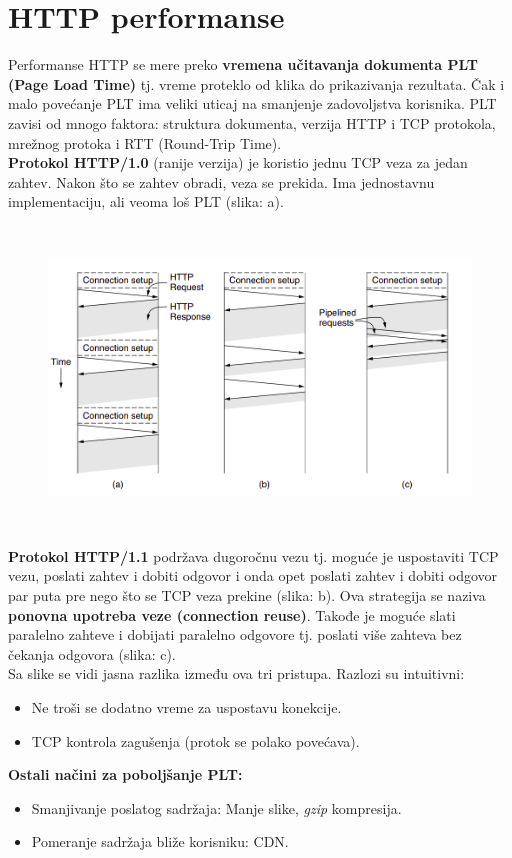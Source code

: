 \documentclass[a4paper]{article}
\begin{document}
\section{HTTP performanse}
    Performanse HTTP se mere preko \textbf{vremena učitavanja dokumenta PLT (Page Load Time)} tj.
    vreme proteklo od klika do prikazivanja rezultata. Čak i malo povećanje PLT ima veliki uticaj
    na smanjenje zadovoljstva korisnika. PLT zavisi od mnogo faktora: struktura dokumenta,
    verzija HTTP i TCP protokola, mrežnog protoka i RTT (Round-Trip Time).\\
    \indent \textbf{Protokol HTTP/1.0} (ranije verzija) je koristio jednu TCP veza za jedan zahtev. 
    Nakon što se zahtev obradi, veza se prekida. Ima jednostavnu implementaciju, 
    ali veoma loš PLT (slika: a). 
    \begin{figure}[H]
        \begin{center}
            \includegraphics[width=120mm,height=80mm]{Slike/http7.png}
        \end{center}
    \end{figure}

    \textbf{Protokol HTTP/1.1} podržava dugoročnu vezu tj. moguće je uspostaviti TCP vezu, poslati
    zahtev i dobiti odgovor i onda opet poslati zahtev i dobiti odgovor par puta pre nego što se
    TCP veza prekine (slika: b). Ova strategija se naziva 
    \textbf{ponovna upotreba veze (connection reuse)}. Takođe je moguće slati paralelno zahteve
    i dobijati paralelno odgovore tj. poslati više zahteva bez čekanja odgovora (slika: c). \\
    \indent Sa slike se vidi jasna razlika između ova tri pristupa. Razlozi su intuitivni:
    \begin{itemize}
        \item Ne troši se dodatno vreme za uspostavu konekcije.
        \item TCP kontrola zagušenja (protok se polako povećava).
    \end{itemize}
    \textbf{Ostali načini za poboljšanje PLT:}
    \begin{itemize}
        \item Smanjivanje poslatog sadržaja: Manje slike, \textit{gzip} kompresija.
        \item Pomeranje sadržaja bliže korisniku: CDN.
    \end{itemize}
    
\end{document}
